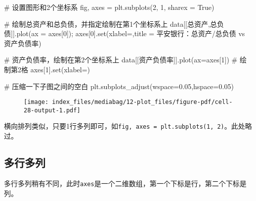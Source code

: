 \documentclass[
  letterpaper,
  DIV=11,
  numbers=noendperiod]{scrreprt}
\newenvironment{Shaded}{\begin{snugshade}}{\end{snugshade}}
\newcommand{\BuiltInTok}[1]{\textcolor[rgb]{0.00,0.23,0.31}{#1}}
\newcommand{\CommentTok}[1]{\textcolor[rgb]{0.37,0.37,0.37}{#1}}
\newcommand{\DecValTok}[1]{\textcolor[rgb]{0.68,0.00,0.00}{#1}}
\newcommand{\FloatTok}[1]{\textcolor[rgb]{0.68,0.00,0.00}{#1}}
\newcommand{\NormalTok}[1]{\textcolor[rgb]{0.00,0.23,0.31}{#1}}
\newcommand{\OperatorTok}[1]{\textcolor[rgb]{0.37,0.37,0.37}{#1}}
\newcommand{\StringTok}[1]{\textcolor[rgb]{0.13,0.47,0.30}{#1}}
\newcommand{\VariableTok}[1]{\textcolor[rgb]{0.07,0.07,0.07}{#1}}
\begin{document}
\begin{Shaded}
\begin{Highlighting}[]
\CommentTok{\# 设置图形和2个坐标系}
\NormalTok{fig, axes }\OperatorTok{=}\NormalTok{ plt.subplots(}\DecValTok{2}\NormalTok{, }\DecValTok{1}\NormalTok{, sharex }\OperatorTok{=} \VariableTok{True}\NormalTok{) }

\CommentTok{\# 绘制总资产和总负债，并指定绘制在第1个坐标系上}
\NormalTok{data[[}\StringTok{\textquotesingle{}总资产\textquotesingle{}}\NormalTok{,}\StringTok{\textquotesingle{}总负债\textquotesingle{}}\NormalTok{]].plot(ax }\OperatorTok{=}\NormalTok{ axes[}\DecValTok{0}\NormalTok{])}\OperatorTok{;}
\NormalTok{axes[}\DecValTok{0}\NormalTok{].}\BuiltInTok{set}\NormalTok{(xlabel}\OperatorTok{=}\StringTok{\textquotesingle{}\textquotesingle{}}\NormalTok{,title }\OperatorTok{=} \StringTok{\textquotesingle{}平安银行：总资产/总负债 vs 资产负债率\textquotesingle{}}\NormalTok{)}

\CommentTok{\# 资产负债率，绘制在第2个坐标系上}
\NormalTok{data[[}\StringTok{\textquotesingle{}资产负债率\textquotesingle{}}\NormalTok{]].plot(ax}\OperatorTok{=}\NormalTok{axes[}\DecValTok{1}\NormalTok{]) }\CommentTok{\# 绘制第2格}
\NormalTok{axes[}\DecValTok{1}\NormalTok{].}\BuiltInTok{set}\NormalTok{(xlabel}\OperatorTok{=}\StringTok{\textquotesingle{}\textquotesingle{}}\NormalTok{)}

\CommentTok{\# 压缩一下子图之间的空白}
\NormalTok{plt.subplots\_adjust(wspace}\OperatorTok{=}\FloatTok{0.05}\NormalTok{,hspace}\OperatorTok{=}\FloatTok{0.05}\NormalTok{)}
\end{Highlighting}
\end{Shaded}

\begin{figure}[H]

{\centering \texttt{[image: index\_files/mediabag/12-plot\_files/figure-pdf/cell-28-output-1.pdf]}

}

\end{figure}

横向排列类似，只要1行多列即可，如\texttt{fig,\ axes\ =\ plt.subplots(1,\ 2)}。此处略过。

\hypertarget{ux591aux884cux591aux5217}{%
\subsection{多行多列}\label{ux591aux884cux591aux5217}}

多行多列稍有不同，此时\texttt{axes}是一个二维数组，第一个下标是行，第二个下标是列。
\end{document}
